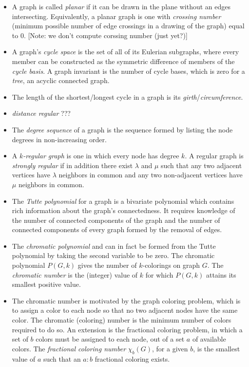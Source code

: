 \documentclass[12pt]{article}
\begin{document}
\begin{itemize}
\item A graph is called \textit{planar} if it can be drawn in the plane without an edges intersecting. Equivalently, a planar graph is one with \textit{crossing number} (minimum possible number of edge crossings in a drawing of the graph) equal to 0. [Note: we don't compute corssing number (just yet?)]

\item A graph's \textit{cycle space} is the set of all of its Eulerian subgraphs, where every member can be constructed as the symmetric difference of members of the \textit{cycle basis}. A graph invariant is the number of cycle bases, which is zero for a \textit{tree}, an acyclic connected graph.

\item The length of the shortest/longest cycle in a graph is its \textit{girth}/\textit{circumference}.
 
\item \textit{distance regular} ???

\item The \textit{degree sequence} of a graph is the sequence formed by listing the node degrees in non-increasing order.  

\item A \textit{$k$-regular graph} is one in which every node has degree $k$. A regular graph is \textit{strongly regular} if in addition there exist $\lambda$ and $\mu$ such that any two adjacent vertices have $\lambda$ neighbors in common and any two non-adjacent vertices have $\mu$ neighbors in common. 

\item The \textit{Tutte polynomial} for a graph is a bivariate polynomial which contains rich information about the graph's connectedness. It requires knowledge of the number of connected components of the graph and the number of connected components of every graph formed by the removal of edges. 

\item The \textit{chromatic polynomial} and can in fact be formed from the Tutte polynomial by taking the second variable to be zero. The chromatic polynomial $P(G,k)$ gives the number of $k$-colorings on graph $G$. The \textit{chromatic number} is the (integer) value of $k$ for which $P(G,k)$ attains its smallest positive value. 

\item The chromatic number is motivated by the graph coloring problem, which is to assign a color to each node so that no two adjacent nodes have the same color. The chromatic (coloring) number is the minimum number of colors required to do so. An extension is the fractional coloring problem, in which a set of $b$ colors must be assigned to each node, out of a set $a$ of available colors. The \textit{fractional coloring number} $\chi_b(G)$, for a given $b$, is the smallest value of $a$ such that an $a:b$ fractional coloring exists. 


\end{itemize}
\end{document}
